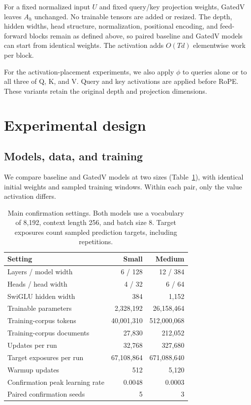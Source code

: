 \documentclass[11pt,a4paper]{article}
\begin{document}
For a fixed normalized input $U$ and fixed query/key projection weights, GatedV leaves $A_h$ unchanged. No trainable tensors are added or resized. The depth, hidden widths, head structure, normalization, positional encoding, and feed-forward blocks remain as defined above, so paired baseline and GatedV models can start from identical weights. The activation adds $O(Td)$ elementwise work per block. 

For the activation-placement experiments, we also apply $\phi$ to queries alone or to all three of Q, K, and V. Query and key activations are applied before RoPE. These variants retain the original depth and projection dimensions.

\FloatBarrier

\section{Experimental design}
\label{sec:experiments}

\subsection{Models, data, and training}
\label{sec:training}
We compare baseline and GatedV models at two sizes (Table~\ref{tab:backbone}), with identical initial weights and sampled training windows. Within each pair, only the value activation differs.

\begin{table}[t]
\centering\small
\caption{Main confirmation settings. Both models use a vocabulary of 8,192, context length 256, and batch size 8. Target exposures count sampled prediction targets, including repetitions.}
\label{tab:backbone}
\begin{tabular}{lrr}
\toprule
Setting & Small & Medium\\
\midrule
Layers / model width & 6 / 128 & 12 / 384\\
Heads / head width & 4 / 32 & 6 / 64\\
SwiGLU hidden width & 384 & 1,152\\
Trainable parameters & 2,328,192 & 26,158,464\\
Training-corpus tokens & 40,001,310 & 512,000,068\\
Training-corpus documents & 27,830 & 212,052\\
Updates per run & 32,768 & 327,680\\
Target exposures per run & 67,108,864 & 671,088,640\\
Warmup updates & 512 & 5,120\\
Confirmation peak learning rate & 0.0048 & 0.0003\\
Paired confirmation seeds & 5 & 3\\
\bottomrule
\end{tabular}
\end{table}
\end{document}
